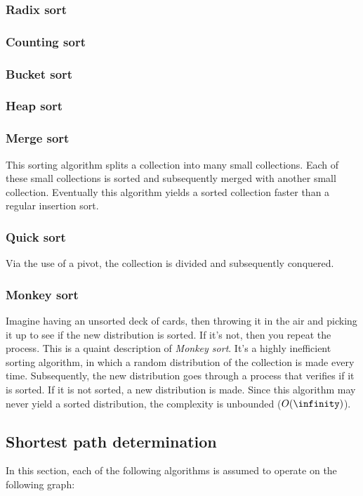 \documentclass{article}
\begin{document}
\subsubsection{Radix sort}

\subsubsection{Counting sort}

\subsubsection{Bucket sort}

\subsubsection{Heap sort}

\subsubsection{Merge sort}
This sorting algorithm splits a collection into many small collections.
Each of these small collections is sorted and subsequently merged with another small collection.
Eventually this algorithm yields a sorted collection faster than a regular insertion sort.

\subsubsection{Quick sort}
Via the use of a pivot, the collection is divided and subsequently conquered.

\subsubsection{Monkey sort}
Imagine having an unsorted deck of cards, then throwing it in the air and picking it up to see if the new distribution is sorted.
If it's not, then you repeat the process. This is a quaint description of {\em Monkey sort}.
It's a highly inefficient sorting algorithm, in which a random distribution of the collection is made every time.
Subsequently, the new distribution goes through a process that verifies if it is sorted. If it is not sorted, a new distribution is made.
Since this algorithm may never yield a sorted distribution, the complexity is unbounded ($O(\infinity)$).

\newpage

\subsection{Shortest path determination}
In this section, each of the following algorithms is assumed to operate on the following graph:
\end{document}
